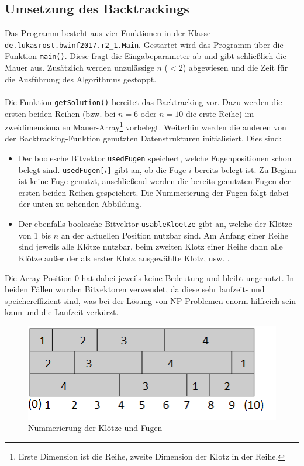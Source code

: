 \documentclass[a4paper, notitlepage, 12pt]{scrartcl}
\begin{document}
\subsection{Umsetzung des Backtrackings}
Das Programm besteht aus vier Funktionen in der Klasse \texttt{de.lukasrost.bwinf2017.r2\_1.Main}. Gestartet wird das Programm über die Funktion \texttt{main()}. Diese fragt die Eingabeparameter ab und gibt schließlich die Mauer aus. Zusätzlich werden unzulässige $n$ ($< 2$) abgewiesen und die Zeit für die Ausführung des Algorithmus gestoppt. \\ \\
Die Funktion \texttt{getSolution()} bereitet das Backtracking vor. Dazu werden die ersten beiden Reihen (bzw. bei $n = 6$ oder $n = 10$ die erste Reihe) im zweidimensionalen Mauer-Array\footnote{Erste Dimension ist die Reihe, zweite Dimension der Klotz in der Reihe.} vorbelegt. Weiterhin werden die anderen von der Backtracking-Funktion genutzten Datenstrukturen initialisiert. Dies sind: 
\begin{itemize}
\item Der boolesche Bitvektor \texttt{usedFugen} speichert, welche Fugenpositionen schon belegt sind. \texttt{usedFugen[$i$]} gibt an, ob die Fuge $i$ bereits belegt ist. Zu Beginn ist keine Fuge genutzt, anschließend werden die bereits genutzten Fugen der ersten beiden Reihen gespeichert. Die Nummerierung der Fugen folgt dabei der unten zu sehenden Abbildung.
\item Der ebenfalls boolesche Bitvektor \texttt{usableKloetze} gibt an, welche der Klötze von 1 bis $n$ an der aktuellen Position nutzbar sind. Am Anfang einer Reihe sind jeweils alle Klötze nutzbar, beim zweiten Klotz einer Reihe dann alle Klötze außer der als erster Klotz ausgewählte Klotz, usw. .
\end{itemize}
Die Array-Position $0$ hat dabei jeweils keine Bedeutung und bleibt ungenutzt. In beiden Fällen wurden Bitvektoren verwendet, da diese sehr laufzeit- und speichereffizient sind, was bei der Lösung von NP-Problemen enorm hilfreich sein kann und die Laufzeit verkürzt. \\
\begin{figure}[H]
\begin{center}
\includegraphics[scale=1.0]{pics/mauerBenennung.png}
\caption{Nummerierung der Klötze und Fugen}
\end{center}
\end{figure}
\end{document}
